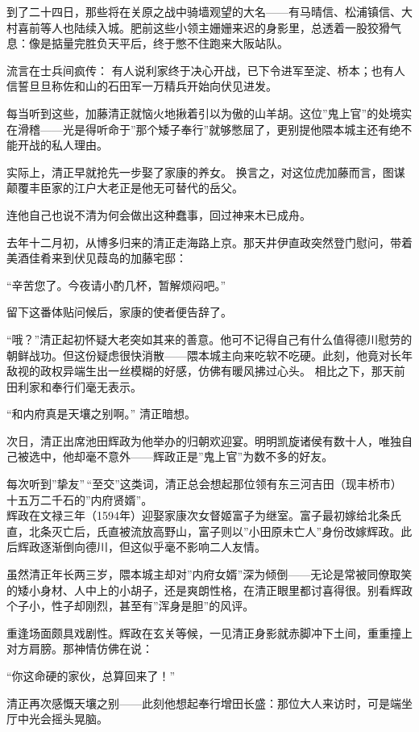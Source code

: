 \documentclass[
]{article}
\begin{document}
到了二十四日，那些将在关原之战中骑墙观望的大名------有马晴信、松浦镇信、大村喜前等人也陆续入城。肥前这些小领主姗姗来迟的身影里，总透着一股狡猾气息：像是掂量完胜负天平后，终于憋不住跑来大阪站队。

流言在士兵间疯传： 有人说利家终于决心开战，已下令进军至淀、桥本；也有人信誓旦旦称佐和山的石田军一万精兵开始向伏见进发。

每当听到这些，加藤清正就恼火地揪着引以为傲的山羊胡。这位''鬼上官''的处境实在滑稽------光是得听命于''那个矮子奉行''就够憋屈了，更别提他隈本城主还有绝不能开战的私人理由。

实际上，清正早就抢先一步娶了家康的养女。 换言之，对这位虎加藤而言，图谋颠覆丰臣家的江户大老正是他无可替代的岳父。

连他自己也说不清为何会做出这种蠢事，回过神来木已成舟。

去年十二月初，从博多归来的清正走海路上京。那天井伊直政突然登门慰问，带着美酒佳肴来到伏见葭岛的加藤宅邸：

``辛苦您了。今夜请小酌几杯，暂解烦闷吧。''

留下这番体贴问候后，家康的使者便告辞了。

``哦？''清正起初怀疑大老突如其来的善意。他可不记得自己有什么值得德川慰劳的朝鲜战功。但这份疑虑很快消散------隈本城主向来吃软不吃硬。此刻，他竟对长年敌视的政权异端生出一丝模糊的好感，仿佛有暖风拂过心头。 相比之下，那天前田利家和奉行们毫无表示。

``和内府真是天壤之别啊。'' 清正暗想。

次日，清正出席池田辉政为他举办的归朝欢迎宴。明明凯旋诸侯有数十人，唯独自己被选中，他却毫不意外------辉政正是''鬼上官''为数不多的好友。

每次听到''挚友''\,``至交''这类词，清正总会想起那位领有东三河吉田（现丰桥市）十五万二千石的''内府贤婿''。\\

辉政在文禄三年（1594年）迎娶家康次女督姬富子为继室。富子最初嫁给北条氏直，北条灭亡后，氏直被流放高野山，富子则以''小田原未亡人''身份改嫁辉政。此后辉政逐渐倒向德川，但这似乎毫不影响二人友情。

虽然清正年长两三岁，隈本城主却对''内府女婿''深为倾倒------无论是常被同僚取笑的矮小身材、人中上的小胡子，还是爽朗性格，在清正眼里都讨喜得很。别看辉政个子小，性子却刚烈，甚至有''浑身是胆''的风评。

重逢场面颇具戏剧性。辉政在玄关等候，一见清正身影就赤脚冲下土间，重重撞上对方肩膀。那神情仿佛在说：

``你这命硬的家伙，总算回来了！''

清正再次感慨天壤之别------此刻他想起奉行增田长盛：那位大人来访时，可是端坐厅中光会摇头晃脑。
\end{document}
